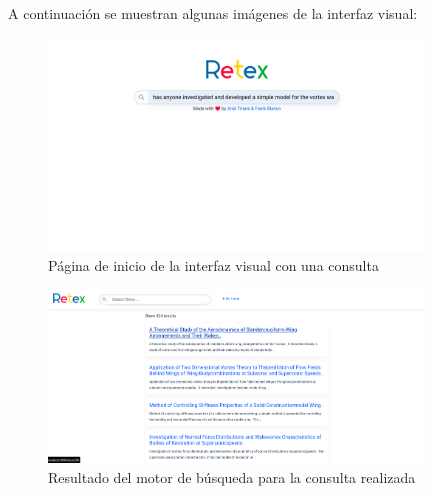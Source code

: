 A continuación se muestran algunas imágenes de la interfaz visual:

\begin{figure}
    \includegraphics[width=10cm]{sections/img/home.png}
    \caption{Página de inicio de la interfaz visual con una consulta}
\end{figure}

\begin{figure}
    \includegraphics[width=10cm]{sections/img/result.png}
    \caption{Resultado del motor de búsqueda para la consulta realizada}
\end{figure}

